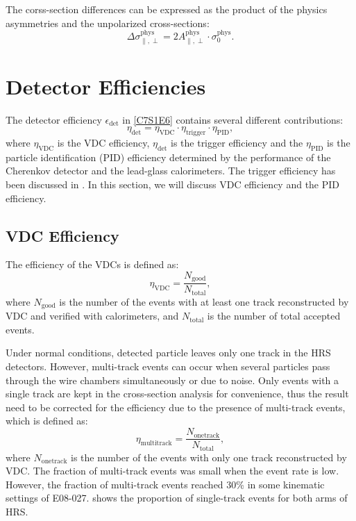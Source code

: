 The corss-section differences can be expressed as the product of the physics asymmetries and the unpolarized cross-sections:
\begin{equation} \label{C7S1E9}
\Delta\sigma_{\parallel,\perp}^{\mathrm{phys}} = 2A_{\parallel,\perp}^{\mathrm{phys}}\cdot\sigma_0^{\mathrm{phys}}.
\end{equation}

\section{Detector Efficiencies}
\label{C7S2}

The detector efficiency $\epsilon_{\mathrm{det}}$ in \cref{C7S1E6} contains several different contributions:
\begin{equation} \label{C7S2E1}
\eta_{\mathrm{det}} = \eta_{\mathrm{VDC}}\cdot\eta_{\mathrm{trigger}}\cdot\eta_{\mathrm{PID}},
\end{equation}
where $\eta_{\mathrm{VDC}}$ is the VDC efficiency, $\eta_{\mathrm{det}}$ is the trigger efficiency and the $\eta_{\mathrm{PID}}$ is the particle identification (PID) efficiency determined by the performance of the Cherenkov detector and the lead-glass calorimeters. The trigger efficiency has been discussed in . In this section, we will discuss VDC efficiency and the PID efficiency.

\subsection{VDC Efficiency}
\label{C7S2SS1}

The efficiency of the VDCs is defined as:
\begin{equation} \label{C7S2E2}
\eta_{\mathrm{VDC}} = \frac{N_{\mathrm{good}}}{N_{\mathrm{total}}},
\end{equation}
where $N_{\mathrm{good}}$ is the number of the events with at least one track reconstructed by VDC and verified with calorimeters, and $N_{\mathrm{total}}$ is the number of total accepted events.

Under normal conditions, detected particle leaves only one track in the HRS detectors. However, multi-track events can occur when several particles pass through the wire chambers simultaneously or due to noise. Only events with a single track are kept in the cross-section analysis for convenience, thus the result need to be corrected for the efficiency due to the presence of multi-track events, which is defined as:
\begin{equation} \label{C7S2E3}
\eta_{\mathrm{multitrack}} = \frac{N_{\mathrm{onetrack}}}{N_{\mathrm{total}}},
\end{equation}
where $N_{\mathrm{onetrack}}$ is the number of the events with only one track reconstructed by VDC. The fraction of multi-track events was small when the event rate is low. However, the fraction of multi-track events reached 30\% in some kinematic settings of E08-027.  shows the proportion of single-track events for both arms of HRS.

